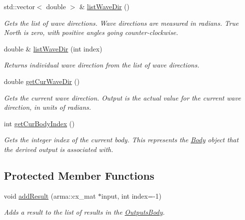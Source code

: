 \begin{DoxyCompactItemize}
std\-::vector$<$ double $>$ \& \hyperlink{classosea_1_1ofreq_1_1_output_derived_a114e057d84f34e5138d077fd7f053898}{list\-Wave\-Dir} ()
\begin{DoxyCompactList}\small\item\em Gets the list of wave directions. Wave directions are measured in radians. True North is zero, with positive angles going counter-\/clockwise. \end{DoxyCompactList}\item 
double \& \hyperlink{classosea_1_1ofreq_1_1_output_derived_a043a3621ac94b69cd16170a550bb3905}{list\-Wave\-Dir} (int index)
\begin{DoxyCompactList}\small\item\em Returns individual wave direction from the list of wave directions. \end{DoxyCompactList}\item 
double \hyperlink{classosea_1_1ofreq_1_1_output_derived_a4bc65913a6296429faf034aa4597ade2}{get\-Cur\-Wave\-Dir} ()
\begin{DoxyCompactList}\small\item\em Gets the current wave direction. Output is the actual value for the current wave direction, in units of radians. \end{DoxyCompactList}\item 
int \hyperlink{classosea_1_1ofreq_1_1_output_derived_a2218b0d3cb0a625e3b3bd4bbeedf3a32}{get\-Cur\-Body\-Index} ()
\begin{DoxyCompactList}\small\item\em Gets the integer index of the current body. This represents the \hyperlink{classosea_1_1ofreq_1_1_body}{Body} object that the derived output is associated with. \end{DoxyCompactList}\end{DoxyCompactItemize}
\subsection*{Protected Member Functions}
\begin{DoxyCompactItemize}
\item 
void \hyperlink{classosea_1_1ofreq_1_1_output_derived_ad9e35015d8e59867401eda8e78879aa6}{add\-Result} (arma\-::cx\-\_\-mat $\ast$input, int index=-\/1)
\begin{DoxyCompactList}\small\item\em Adds a result to the list of results in the \hyperlink{classosea_1_1ofreq_1_1_outputs_body}{Outputs\-Body}. \end{DoxyCompactList}\end{DoxyCompactItemize}

